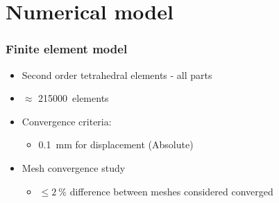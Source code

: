 \documentclass[aspectratio=169,xcolor={svgnames,table},10pt,fleqn]{beamer}
\begin{document}
\section{Numerical model}

  \begin{frame}
    \frametitle{Finite element model}
    \begin{itemize}
      \item Second order tetrahedral elements - all parts
      \item $\approx$ \qty{215000}{elements}
      \item Convergence criteria:
        \begin{itemize}
          \item \qty{0.1}{\milli\meter} for displacement (Absolute)
        \end{itemize}
      \item Mesh convergence study
        \begin{itemize}
          \item $\le\qty{2}{\percent}$ difference between meshes considered converged 
        \end{itemize}
    \end{itemize}

  \end{frame}
\end{document}
